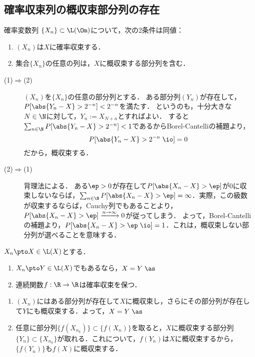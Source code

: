 \documentclass[uplatex,dvipdfmx]{jsreport}
\begin{document}
\subsection{確率収束列の概収束部分列の存在}

\begin{proposition}
    確率変数列
    $\{X_n\}\subset\L(\Om)$について，次の2条件は同値：
    \begin{enumerate}
        \item $(X_n)$は$X$に確率収束する．
        \item 集合$\{X_n\}$の任意の列は，$X$に概収束する部分列を含む．
    \end{enumerate}
\end{proposition}
\begin{Proof}\mbox{}
    \begin{description}
        \item[(1)$\Rightarrow$(2)] $(X_n)$を$\{X_n\}$の任意の部分列とする．
        ある部分列$(Y_n)$が存在して，$P[\abs{Y_n-X}>2^{-n}]<2^{-n}$を満たす．
        というのも，十分大きな$N\in\N$に対して，$Y_n:=X_{N+n}$とすればよい．
        すると$\sum_{n\in\N}P[\abs{Y_n-X}>2^{-n}]<1$であるからBorel-Cantelliの補題より，
        \[P[\abs{Y_n-X}>2^{-n}\;\io]=0\]
        だから，概収束する．
        \item[(2)$\Rightarrow$(1)] 背理法による．
        ある$\ep>0$が存在して$P[\abs{X_n-X}>\ep]$が$0$に収束しないならば，$\sum_{n\in\N}P[\abs{X_n-X}>\ep]=\infty$．実際，この級数が収束するならば，Cauchy列でもあることより，$P[\abs{X_n-X}>\ep]\xrightarrow{n\to\infty}0$が従ってしまう．
        よって，Borel-Cantelliの補題より，$P[\abs{X_n-X}>\ep\;\io]=1$．これは，概収束しない部分列が選べることを意味する．
    \end{description}
\end{Proof}

\begin{corollary}[確率収束の連続写像定理]
    $X_n\pto X\in\L(X)$とする．
    \begin{enumerate}
        \item $X_n\pto Y\in\L(X)$でもあるなら，$X=Y\;\as$
        \item 連続関数$f:\R\to\R$は確率収束を保つ．
    \end{enumerate}
\end{corollary}
\begin{Proof}\mbox{}
    \begin{enumerate}
        \item $(X_n)$にはある部分列が存在して$X$に概収束し，さらにその部分列が存在して$Y$にも概収束する．よって，$X=Y\;\as$
        \item 任意に部分列$\{f(X_{n_k})\}\subset\{f(X_n)\}$を取ると，$X$に概収束する部分列$\{Y_n\}\subset\{X_{n_k}\}$が取れる．これについて，$f(Y_n)$は$X$に概収束するから，$\{f(Y_n)\}$も$f(X)$に概収束する．
    \end{enumerate}
\end{Proof}
\end{document}
